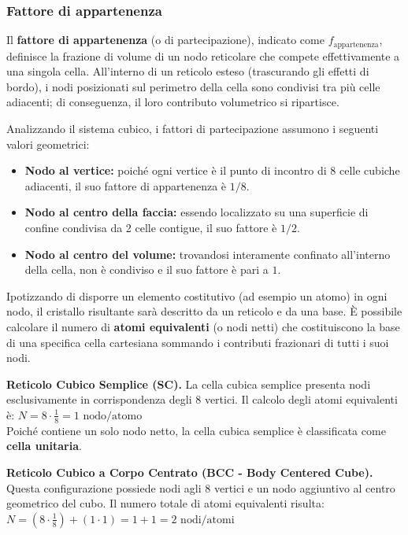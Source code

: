 \subsubsection{Fattore di appartenenza}

Il \textbf{fattore di appartenenza} (o di partecipazione), indicato come \( f_{\text{appartenenza}} \), definisce la frazione di volume di un nodo reticolare che compete effettivamente a una singola cella. All'interno di un reticolo esteso (trascurando gli effetti di bordo), i nodi posizionati sul perimetro della cella sono condivisi tra più celle adiacenti; di conseguenza, il loro contributo volumetrico si ripartisce.

Analizzando il sistema cubico, i fattori di partecipazione assumono i seguenti valori geometrici:
\begin{itemize}
    \item \textbf{Nodo al vertice:} poiché ogni vertice è il punto di incontro di 8 celle cubiche adiacenti, il suo fattore di appartenenza è \( 1/8 \).
    \item \textbf{Nodo al centro della faccia:} essendo localizzato su una superficie di confine condivisa da 2 celle contigue, il suo fattore è \( 1/2 \).
    \item \textbf{Nodo al centro del volume:} trovandosi interamente confinato all'interno della cella, non è condiviso e il suo fattore è pari a \( 1 \).
\end{itemize}

Ipotizzando di disporre un elemento costitutivo (ad esempio un atomo) in ogni nodo, il cristallo risultante sarà descritto da un reticolo e da una base. È possibile calcolare il numero di \textbf{atomi equivalenti} (o nodi netti) che costituiscono la base di una specifica cella cartesiana sommando i contributi frazionari di tutti i suoi nodi.

\textbf{Reticolo Cubico Semplice (SC).} La cella cubica semplice presenta nodi esclusivamente in corrispondenza degli 8 vertici. Il calcolo degli atomi equivalenti è:
\( N = 8 \cdot \frac{1}{8} = 1 \text{ nodo/atomo} \) \\
Poiché contiene un solo nodo netto, la cella cubica semplice è classificata come \textbf{cella unitaria}.

\textbf{Reticolo Cubico a Corpo Centrato (BCC - Body Centered Cube).} Questa configurazione possiede nodi agli 8 vertici e un nodo aggiuntivo al centro geometrico del cubo. Il numero totale di atomi equivalenti risulta:
\( N = \left( 8 \cdot \frac{1}{8} \right) + \left( 1 \cdot 1 \right) = 1 + 1 = 2 \text{ nodi/atomi} \)

